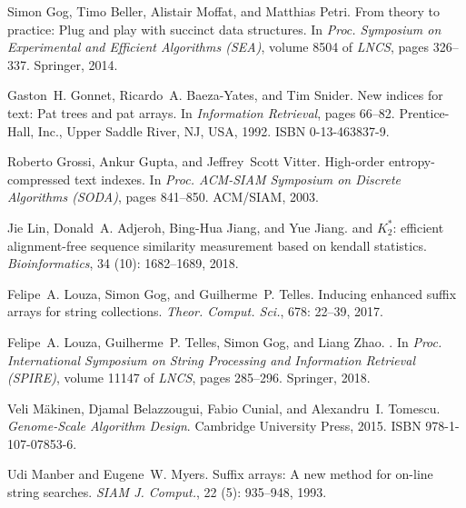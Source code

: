 \documentclass{elsarticle}
\begin{document}
\begin{thebibliography}{35}
Simon Gog, Timo Beller, Alistair Moffat, and Matthias Petri.
\newblock From theory to practice: Plug and play with succinct data structures.
\newblock In \emph{Proc. Symposium on Experimental and Efficient Algorithms
  (SEA)}, volume 8504 of \emph{LNCS}, pages 326--337. Springer, 2014.

Gaston~H. Gonnet, Ricardo~A. Baeza-Yates, and Tim Snider.
\newblock New indices for text: Pat trees and pat arrays.
\newblock In \emph{Information Retrieval}, pages 66--82. Prentice-Hall, Inc.,
  Upper Saddle River, NJ, USA, 1992.
\newblock ISBN 0-13-463837-9.

Roberto Grossi, Ankur Gupta, and Jeffrey~Scott Vitter.
\newblock High-order entropy-compressed text indexes.
\newblock In \emph{Proc. ACM-SIAM Symposium on Discrete Algorithms (SODA)},
  pages 841--850. {ACM/SIAM}, 2003.

Jie Lin, Donald~A. Adjeroh, Bing{-}Hua Jiang, and Yue Jiang.
 and {$K_2^*$}: efficient alignment-free sequence similarity
  measurement based on kendall statistics.
\newblock \emph{Bioinformatics}, 34 (10): 1682--1689, 2018.

Felipe~A. Louza, Simon Gog, and Guilherme~P. Telles.
\newblock Inducing enhanced suffix arrays for string collections.
\newblock \emph{Theor. Comput. Sci.}, 678: 22--39, 2017.

Felipe~A. Louza, Guilherme~P. Telles, Simon Gog, and Liang Zhao.
.
\newblock In \emph{Proc. International Symposium on String Processing and
  Information Retrieval (SPIRE)}, volume 11147 of \emph{LNCS}, pages 285--296.
  Springer, 2018.

Veli M{\"a}kinen, Djamal Belazzougui, Fabio Cunial, and Alexandru~I. Tomescu.
\newblock \emph{Genome-Scale Algorithm Design}.
\newblock Cambridge University Press, 2015.
\newblock ISBN 978-1-107-07853-6.

Udi Manber and Eugene~W. Myers.
\newblock Suffix arrays: A new method for on-line string searches.
\newblock \emph{SIAM J. Comput.}, 22 (5): 935--948, 1993.


\end{thebibliography}
\end{document}
